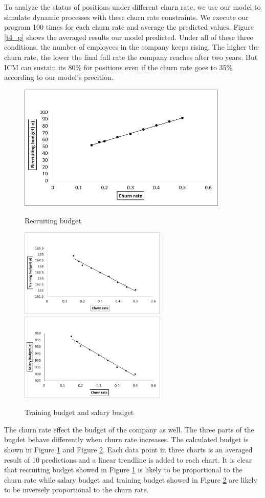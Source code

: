 \documentclass[12pt,a4paper,titlepage]{article}
\begin{document}
To analyze the status of positions under different churn rate, we use our model to simulate dynamic processes with these churn rate constraints. We execute our program 100 times for each churn rate and average the predicted values. Figure \ref{t4_p} shows the averaged results our model predicted. Under all of these three conditions, the number of employees in the company keeps rising. The higher the churn rate, the lower the final full rate the company reaches after two years. But ICM can sustain its 80\% for positions even if the churn rate goes to 35\% according to our model's precition.

\begin{figure}[htb]
  \centering
  \includegraphics[width=10cm]{task4_r.pdf}\\
  \caption{Recruiting budget}\label{t4_r}
\end{figure}
\begin{figure}[htb]
  \centering
  \includegraphics[width=7cm]{task4_t.pdf}
  \includegraphics[width=7cm]{task4_s.pdf}\\
  \caption{Training budget and salary budget}\label{t4_t_s}
\end{figure}
The churn rate effect the budget of the company as well. The three parts of the bugdet behave differently when churn rate increases. The calculated budget is shown in Figure \ref{t4_r} and Figure \ref{t4_t_s}. Each data point in three charts is an averaged result of 10 predictions and a linear trendline is added to each chart. It is clear that recruiting budget showed in Figure \ref{t4_r} is likely to be proportional to the churn rate while salary budget and training budget showed in Figure \ref{t4_t_s} are likely to be inversely proportional to the churn rate.
\end{document}
